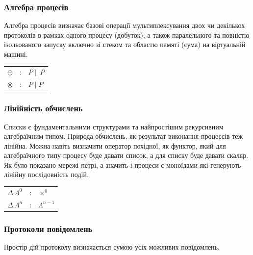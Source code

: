 \documentclass[11pt,oneside]{article}
\begin{document}
  \subsubsection*{Алгебра процесів}

  Алгебра процесів визначає базові операції мультиплексування двох чи декількох
  протоколів в рамках одного процесу (добуток), а також паралельного та повністю
  ізольованого запуску включно зі стеком та областю памяті (сума) на
  віртуальній машині.

\begin{center}
\begin{tabular}{lcl}
$\oplus$   &:& $P \parallel P$\\
$\otimes$  &:& $P \mid P$\\
\end{tabular}
\end{center}

  \subsubsection*{Лінійність обчислень}

   Списки
   є фундаментальними структурами та найпростішим рекурсивним алгебраїчним типом.
   Природа обчислень, як результат виконання процессів теж лінійна. Можна навіть визначити
   оператор похідної, як функтор, який для алгебраїчного типу процесу буде давати список,
   а для списку буде давати скаляр. Як було показано \cite{meseguer} мережі петрі,
   а значить і процеси є моноїдами які генерують лінійну послідовність подій.


\begin{center}
\begin{tabular}{lcl}
$\Delta \ \Lambda^0$         &:& $\times^0$ \\
$\Delta \ \Lambda^{n}$       &:& $\Lambda^{n-1}$ \\
\end{tabular}
\end{center}

  \subsubsection*{Протоколи повідомлень}

   Простір дій протоколу визначається сумою усіх можливих повідомлень.
\end{document}
